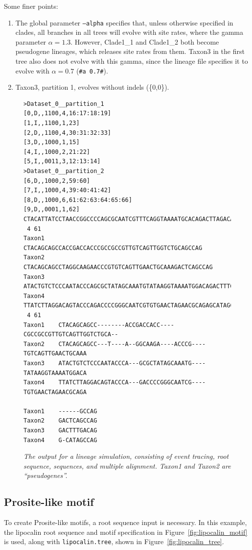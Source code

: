 \documentclass[10pt]{article}
\begin{document}
 Some finer points:
 \begin{enumerate}
 \item The global parameter {\tt --alpha} specifies that, unless otherwise specified in clades, all branches in all trees will evolve with site rates, where the gamma parameter $\alpha=1.3$. However, Clade1\_1 and Clade1\_2 both become pseudogene lineages, which releases site rates from them. Taxon3 in the first tree also does not evolve with this gamma, since the lineage file specifies it to evolve with $\alpha=0.7$ ({\tt \#a 0.7\#}).
 \item Taxon3, partition 1, evolves without indels (\{0,0\}).
 \end{enumerate}

\begin{figure}
\begin{verbatim}
>Dataset_0__partition_1
[0,D,,1100,4,16:17:18:19]
[1,I,,1100,1,23]
[2,D,,1100,4,30:31:32:33]
[3,D,,1000,1,15]
[4,I,,1000,2,21:22]
[5,I,,0011,3,12:13:14]
>Dataset_0__partition_2
[6,D,,1000,2,59:60]
[7,I,,1000,4,39:40:41:42]
[8,D,,1000,6,61:62:63:64:65:66]
[9,D,,0001,1,62]
CTACATTATCCTAACCGGCCCCAGCGCAATCGTTTCAGGTAAAATGCACAGACTTAGACAG
 4 61
Taxon1    CTACAGCAGCCACCGACCACCCGCCGCCGTTGTCAGTTGGTCTGCAGCCAG
Taxon2    CTACAGCAGCCTAGGCAAGAACCCGTGTCAGTTGAACTGCAAAGACTCAGCCAG
Taxon3    ATACTGTCTCCCAATACCCAGCGCTATAGCAAATGTATAAGGTAAAATGGACAGACTTTGACAG
Taxon4    TTATCTTAGGACAGTACCCAGACCCCGGGCAATCGTGTGAACTAGAACGCAGAGCATAGCCAG
 4 61
Taxon1    CTACAGCAGCC--------ACCGACCACC----CGCCGCCGTTGTCAGTTGGTCTGCA--
Taxon2    CTACAGCAGCC---T----A--GGCAAGA----ACCCG----TGTCAGTTGAACTGCAAA
Taxon3    ATACTGTCTCCCAATACCCA---GCGCTATAGCAAATG----TATAAGGTAAAATGGACA
Taxon4    TTATCTTAGGACAGTACCCA---GACCCCGGGCAATCG----TGTGAACTAGAACGCAGA

Taxon1    ------GCCAG
Taxon2    GACTCAGCCAG
Taxon3    GACTTTGACAG
Taxon4    G-CATAGCCAG
\end{verbatim}
\caption{\textit{The output for a lineage simulation, consisting of event tracing, root sequence, sequences, and multiple alignment. Taxon1 and Taxon2 are ``pseudogenes''.}}
\label{fig:lineage_output}
\end{figure}

\subsection{Prosite-like motif}

To create Prosite-like motifs, a root sequence input is necessary. In this example, the lipocalin root sequence and motif specification in Figure~\ref{fig:lipocalin_motif} is used, along with {\tt lipocalin.tree}, shown in Figure~\ref{fig:lipocalin_tree}.
\end{document}
